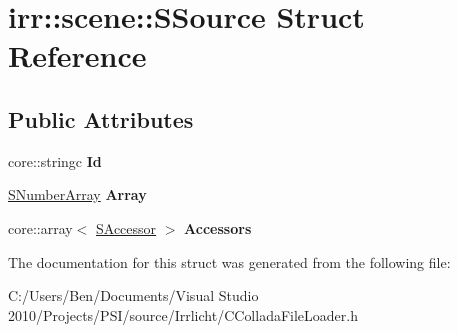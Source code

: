 \hypertarget{structirr_1_1scene_1_1_s_source}{\section{irr\-:\-:scene\-:\-:S\-Source Struct Reference}
\label{structirr_1_1scene_1_1_s_source}
}
\subsection*{Public Attributes}
\begin{DoxyCompactItemize}
\item 
\hypertarget{structirr_1_1scene_1_1_s_source_a0d989590d451c79e205c08516c63b0d2}{core\-::stringc {\bfseries Id}}\label{structirr_1_1scene_1_1_s_source_a0d989590d451c79e205c08516c63b0d2}

\item 
\hypertarget{structirr_1_1scene_1_1_s_source_a780a3f519a536834ca2853609591457e}{\hyperlink{structirr_1_1scene_1_1_s_number_array}{S\-Number\-Array} {\bfseries Array}}\label{structirr_1_1scene_1_1_s_source_a780a3f519a536834ca2853609591457e}

\item 
\hypertarget{structirr_1_1scene_1_1_s_source_a68fe90a3963d0536461a4ee61d6b28ff}{core\-::array$<$ \hyperlink{structirr_1_1scene_1_1_s_accessor}{S\-Accessor} $>$ {\bfseries Accessors}}\label{structirr_1_1scene_1_1_s_source_a68fe90a3963d0536461a4ee61d6b28ff}

\end{DoxyCompactItemize}


The documentation for this struct was generated from the following file\-:\begin{DoxyCompactItemize}
\item 
C\-:/\-Users/\-Ben/\-Documents/\-Visual Studio 2010/\-Projects/\-P\-S\-I/source/\-Irrlicht/C\-Collada\-File\-Loader.\-h\end{DoxyCompactItemize}
